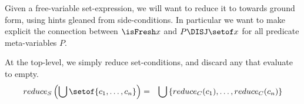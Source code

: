 Given a free-variable set-expression,
we will want to reduce it to towards ground form,
using hints gleaned from side-conditions.
In particular we want to make explicit the
connection between $\isFresh x$ and $P \DISJ \setof x$
for all predicate meta-variables $P$.

At the top-level, we simply reduce set-conditions,
and discard any that evaluate to empty.
\begin{eqnarray*}
  reduce_S\left(\bigcup\setof{c_1,\ldots,c_n}\right)
  &=&
  \bigcup\left\{reduce_C(c_1), \ldots, reduce_C(c_n)\right\}
\end{eqnarray*} 